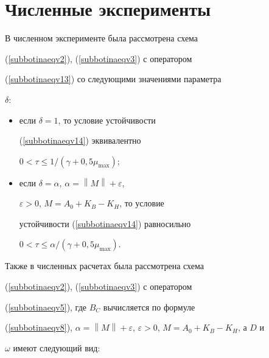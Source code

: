 \section{Численные эксперименты}





В численном эксперименте была рассмотрена схема


(\ref{subbotinaeqv2}), (\ref{subbotinaeqv3}) с оператором


(\ref{subbotinaeqv13}) со следующими значениями параметра


$\delta$:


\begin{itemize}


\item[a)] если $\delta =1$, то условие устойчивости


(\ref{subbotinaeqv14}) эквивалентно 


$0<\tau \le 1 /(\gamma +0{,}5\mu_{\max})$;


\item[b)] если $\delta=\alpha$, $\alpha =\left\| M \right\|+\varepsilon$,


$\varepsilon >0$, $M =A_0+K_B - K_H$, то условие


устойчивости  (\ref{subbotinaeqv14}) равносильно


$0<\tau \le \alpha /(\gamma +0{,}5\mu_{\max})$.


\end{itemize}


Также в численных расчетах была рассмотрена схема


(\ref{subbotinaeqv2}), (\ref{subbotinaeqv3}) с оператором


(\ref{subbotinaeqv5}), где $B_C$ вычисляется по формуле


(\ref{subbotinaeqv8}), $\alpha =\left\| M \right\| +


\varepsilon$, $\varepsilon >0$, $M=A_0+K_B - K_H$, а $D$ и


$\omega$ имеют следующий вид:


